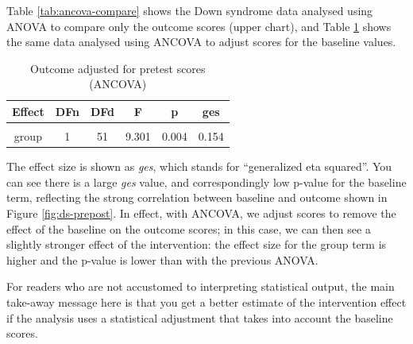 \documentclass{krantz}
\begin{document}
Table \ref{tab:ancova-compare} shows the Down syndrome data analysed using ANOVA to compare only the outcome scores (upper chart), and Table \ref{tab:ancova} shows the same data analysed using ANCOVA to adjust scores for the baseline values.

\begin{table}

\caption{\label{tab:ancova}Outcome adjusted for pretest scores (ANCOVA)}
\centering
\begin{tabular}[t]{cccccc}
\toprule
Effect & DFn & DFd & F & p & ges\\
\midrule
\cellcolor{gray!6}{baseline} & \cellcolor{gray!6}{1} & \cellcolor{gray!6}{51} & \cellcolor{gray!6}{94.313} & \cellcolor{gray!6}{0.000} & \cellcolor{gray!6}{0.649}\\
group & 1 & 51 & 9.301 & 0.004 & 0.154\\
\bottomrule
\end{tabular}
\end{table}

The effect size is shown as \emph{ges}, which stands for ``generalized eta squared''. You can see there is a large \emph{ges} value, and correspondingly low p-value for the baseline term, reflecting the strong correlation between baseline and outcome shown in Figure \ref{fig:ds-prepost}. In effect, with ANCOVA, we adjust scores to remove the effect of the baseline on the outcome scores; in this case, we can then see a slightly stronger effect of the intervention: the effect size for the group term is higher and the p-value is lower than with the previous ANOVA.

For readers who are not accustomed to interpreting statistical output, the main take-away message here is that you get a better estimate of the intervention effect if the analysis uses a statistical adjustment that takes into account the baseline scores.
\end{document}
